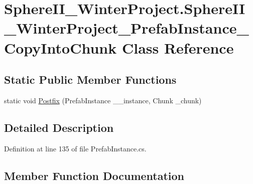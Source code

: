 \hypertarget{class_sphere_i_i___winter_project_1_1_sphere_i_i___winter_project___prefab_instance___copy_into_chunk}{}\section{Sphere\+I\+I\+\_\+\+Winter\+Project.\+Sphere\+I\+I\+\_\+\+Winter\+Project\+\_\+\+Prefab\+Instance\+\_\+\+Copy\+Into\+Chunk Class Reference}
\label{class_sphere_i_i___winter_project_1_1_sphere_i_i___winter_project___prefab_instance___copy_into_chunk}
\subsection*{Static Public Member Functions}
\begin{DoxyCompactItemize}
\item 
static void \mbox{\hyperlink{class_sphere_i_i___winter_project_1_1_sphere_i_i___winter_project___prefab_instance___copy_into_chunk_a06caeadc4100421d9365cc529d9b6879}{Postfix}} (Prefab\+Instance \+\_\+\+\_\+instance, Chunk \+\_\+chunk)
\end{DoxyCompactItemize}


\subsection{Detailed Description}


Definition at line 135 of file Prefab\+Instance.\+cs.



\subsection{Member Function Documentation}
\mbox{\label{class_sphere_i_i___winter_project_1_1_sphere_i_i___winter_project___prefab_instance___copy_into_chunk_a06caeadc4100421d9365cc529d9b6879}} 
